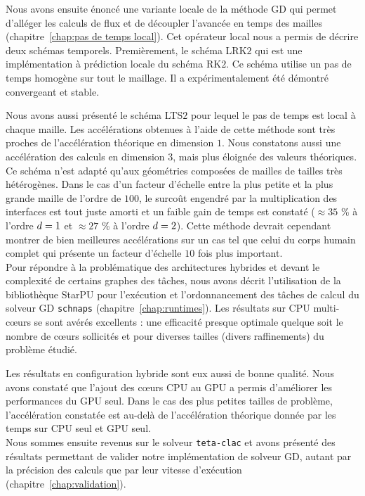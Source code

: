 Nous avons ensuite énoncé
une variante locale de la méthode GD qui
permet d'alléger les calculs de flux et de découpler l'avancée en
temps des mailles (chapitre~\ref{chap:pas de temps local}).
Cet opérateur local nous a permis de décrire deux schémas temporels.
Premièrement, le schéma LRK$2$ qui est une implémentation à prédiction locale
du schéma RK$2$. Ce schéma utilise
un pas de temps homogène sur tout le maillage.
Il a expérimentalement été démontré convergeant et stable.

Nous avons aussi présenté le schéma LTS$2$ pour lequel le pas de
temps est local à chaque maille.
Les accélérations obtenues à l'aide de cette méthode sont
très proches de l'accélération théorique en dimension $1$.
Nous constatons aussi une accélération des calculs
en dimension $3$, mais plus éloignée des valeurs théoriques.
Ce schéma n'est adapté qu'aux géométries composées de mailles de tailles très hétérogènes. Dans le cas d'un facteur d'échelle entre la plus petite
et la plus grande maille de l'ordre de $100$, le surcoût engendré par
la multiplication des interfaces est tout juste amorti et un faible
gain de temps est constaté ($\approx 35$ \% à l'ordre $d = 1$ et
$\approx 27$ \% à l'ordre $d = 2$). Cette méthode
devrait cependant montrer de bien meilleures accélérations
sur un cas tel que celui du corps humain complet
qui présente un facteur d'échelle $10$ fois plus important.
\\



Pour répondre à la problématique des architectures hybrides
et devant le complexité de certains graphes des tâches,
nous avons décrit 
l'utilisation de la bibliothèque StarPU pour l'exécution
et l'ordonnancement des tâches de calcul du solveur GD \texttt{schnaps}
(chapitre~\ref{chap:runtimes}).
Les résultats sur CPU multi-cœurs se sont avérés excellents :
une efficacité presque optimale quelque soit le nombre de cœurs
sollicités et pour diverses tailles (divers raffinements) du problème étudié.

Les résultats en configuration hybride sont eux aussi
de bonne qualité.
Nous avons constaté que l'ajout des cœurs CPU au GPU
a permis d'améliorer les performances du GPU seul.
Dans le cas des plus petites tailles de problème,
l'accélération constatée est au-delà de
l'accélération théorique donnée par les temps sur CPU seul et GPU seul.
\\



Nous sommes ensuite revenus sur le solveur \texttt{teta-clac}
et avons présenté des résultats
permettant de valider notre implémentation de solveur GD, autant
par la précision des calculs que par leur vitesse d'exécution
(chapitre~\ref{chap:validation}).

